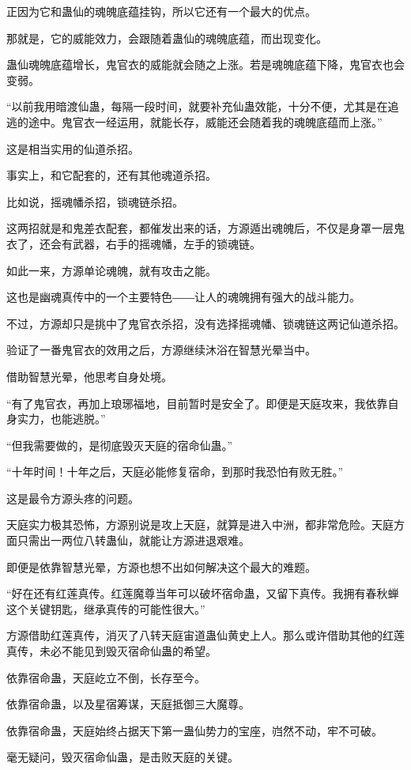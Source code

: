 \begin{this_body}
正因为它和蛊仙的魂魄底蕴挂钩，所以它还有一个最大的优点。

那就是，它的威能效力，会跟随着蛊仙的魂魄底蕴，而出现变化。

蛊仙魂魄底蕴增长，鬼官衣的威能就会随之上涨。若是魂魄底蕴下降，鬼官衣也会变弱。

“以前我用暗渡仙蛊，每隔一段时间，就要补充仙蛊效能，十分不便，尤其是在追逃的途中。鬼官衣一经运用，就能长存，威能还会随着我的魂魄底蕴而上涨。”

这是相当实用的仙道杀招。

事实上，和它配套的，还有其他魂道杀招。

比如说，摇魂幡杀招，锁魂链杀招。

这两招就是和鬼差衣配套，都催发出来的话，方源遁出魂魄后，不仅是身罩一层鬼衣了，还会有武器，右手的摇魂幡，左手的锁魂链。

如此一来，方源单论魂魄，就有攻击之能。

这也是幽魂真传中的一个主要特色――让人的魂魄拥有强大的战斗能力。

不过，方源却只是挑中了鬼官衣杀招，没有选择摇魂幡、锁魂链这两记仙道杀招。

验证了一番鬼官衣的效用之后，方源继续沐浴在智慧光晕当中。

借助智慧光晕，他思考自身处境。

“有了鬼官衣，再加上琅琊福地，目前暂时是安全了。即便是天庭攻来，我依靠自身实力，也能逃脱。”

“但我需要做的，是彻底毁灭天庭的宿命仙蛊。”

“十年时间！十年之后，天庭必能修复宿命，到那时我恐怕有败无胜。”

这是最令方源头疼的问题。

天庭实力极其恐怖，方源别说是攻上天庭，就算是进入中洲，都非常危险。天庭方面只需出一两位八转蛊仙，就能让方源进退艰难。

即便是依靠智慧光晕，方源也想不出如何解决这个最大的难题。

“好在还有红莲真传。红莲魔尊当年可以破坏宿命蛊，又留下真传。我拥有春秋蝉这个关键钥匙，继承真传的可能性很大。”

方源借助红莲真传，消灭了八转天庭宙道蛊仙黄史上人。那么或许借助其他的红莲真传，未必不能见到毁灭宿命仙蛊的希望。

依靠宿命蛊，天庭屹立不倒，长存至今。

依靠宿命蛊，以及星宿筹谋，天庭抵御三大魔尊。

依靠宿命蛊，天庭始终占据天下第一蛊仙势力的宝座，岿然不动，牢不可破。

毫无疑问，毁灭宿命仙蛊，是击败天庭的关键。


\end{this_body}
